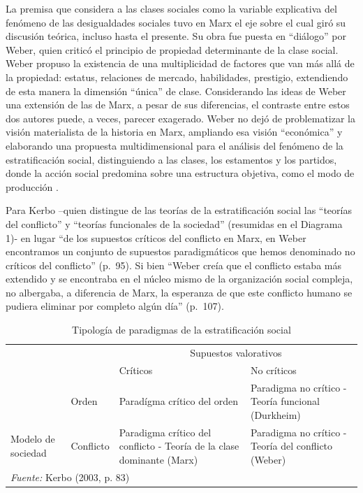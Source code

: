 \documentclass[
]{book}
\begin{document}
La premisa que considera a las clases sociales como la variable explicativa del fenómeno de las desigualdades sociales tuvo en Marx el eje sobre el cual giró su discusión teórica, incluso hasta el presente. Su obra fue puesta en ``diálogo'' por Weber, quien criticó el principio de propiedad determinante de la clase social. Weber \citeyearpar[pp.~682-694]{Weber2002} propuso la existencia de una multiplicidad de factores que van más allá de la propiedad: estatus, relaciones de mercado, habilidades, prestigio, extendiendo de esta manera la dimensión ``única'' de clase. Considerando las ideas de Weber una extensión de las de Marx, a pesar de sus diferencias, el contraste entre estos dos autores puede, a veces, parecer exagerado. Weber no dejó de problematizar la visión materialista de la historia en Marx, ampliando esa visión ``económica'' y elaborando una propuesta multidimensional para el análisis del fenómeno de la estratificación social, distinguiendo a las clases, los estamentos y los partidos, donde la acción social predomina sobre una estructura objetiva, como el modo de producción \citep[p.~130]{Burris1995}.

Para Kerbo \citeyearpar{Kerbo2003} --quien distingue de las teorías de la estratificación social las ``teorías del conflicto'' y ``teorías funcionales de la sociedad'' (resumidas en el Diagrama 1)- en lugar ``de los supuestos críticos del conflicto en Marx, en Weber encontramos un conjunto de supuestos paradigmáticos que hemos denominado no críticos del conflicto'' (p.~95). Si bien ``Weber creía que el conflicto estaba más extendido y se encontraba en el núcleo mismo de la organización social compleja, no albergaba, a diferencia de Marx, la esperanza de que este conflicto humano se pudiera eliminar por completo algún día'' (p.~107).

\begin{table}

\caption{\label{tab:unnamed-chunk-3}Tipología de paradigmas de la estratificación social}
\centering
\begin{tabular}[t]{l|l|l|l}
\hline
\multicolumn{1}{c|}{ } & \multicolumn{1}{c|}{ } & \multicolumn{2}{c}{Supuestos valorativos} \\
\cline{3-4}
 &  & Críticos & No críticos\\
\hline
 & Orden & Paradígma crítico del orden & Paradigma no crítico - Teoría funcional (Durkheim)\\
\cline{2-4}
\multirow{-2}{*}{\raggedright\arraybackslash Modelo de sociedad} & Conflicto & Paradigma crítico del conflicto - Teoría de la clase dominante (Marx) & Paradigma no crítico - Teoría del conflicto (Weber)\\
\hline
\multicolumn{4}{l}{\rule{0pt}{1em}\textit{Fuente: } Kerbo (2003, p. 83)}\\
\end{tabular}
\end{table}
\end{document}
